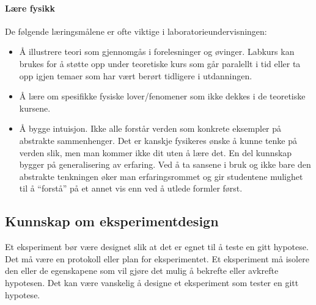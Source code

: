 \documentclass{article}
\begin{document}
\paragraph{Lære fysikk}
De følgende læringsmålene er ofte viktige i laboratorieundervisningen:
\begin{itemize}
    \item Å illustrere teori som gjennomgås i forelesninger og øvinger. Labkurs kan brukes for å støtte opp under teoretiske kurs som går paralellt i tid eller ta opp igjen temaer som har vært berørt tidligere i utdanningen.
    \item Å lære om spesifikke fysiske lover/fenomener som
    ikke dekkes i de teoretiske kursene.
    \item Å bygge intuisjon. Ikke alle forstår verden som konkrete eksempler på abstrakte sammenhenger. Det er kanskje fysikeres ønske å kunne tenke på verden slik, men man kommer ikke dit uten å lære det. En del kunnskap bygger på generalisering av erfaring. Ved å ta sansene i bruk og ikke bare den abstrakte tenkningen øker man erfaringsrommet og gir studentene mulighet til å “forstå” på et annet vis enn ved å utlede formler først.
\end{itemize}

\subsection{Kunnskap om eksperimentdesign}
Et eksperiment bør være designet slik at det er egnet til å teste en gitt hypotese.
Det må være en protokoll eller plan for eksperimentet.
Et eksperiment må isolere den eller de egenskapene som vil gjøre det mulig å bekrefte eller avkrefte hypotesen.
Det kan være vanskelig å designe et eksperiment som tester en gitt hypotese.
\end{document}
